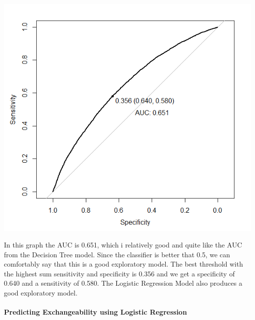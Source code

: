 \documentclass[
]{article}
\begin{document}
\includegraphics{images/Exchange QS/Logistic/LRExplorataryBestRoc.png}

In this graph the AUC is 0.651, which i relatively good and quite like
the AUC from the Decision Tree model. Since the classifier is better
that 0.5, we can comfortably say that this is a good exploratory model.
The best threshold with the highest sum sensitivity and specificity is
0.356 and we get a specificity of 0.640 and a sensitivity of 0.580. The
Logistic Regression Model also produces a good exploratory model.

\hypertarget{predicting-exchangeability-using-logistic-regression}{%
\paragraph{Predicting Exchangeability using Logistic
Regression}\label{predicting-exchangeability-using-logistic-regression}}
\end{document}
